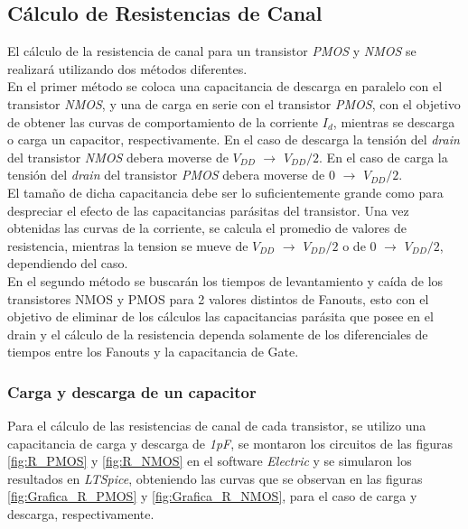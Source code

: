\documentclass[12pt,a4paper]{article} %
\begin{document}
\subsection{Cálculo de Resistencias de Canal}

El cálculo de la resistencia de canal para un transistor \textit{PMOS} y \textit{NMOS} se realizará utilizando dos métodos diferentes.\\

En el primer método se coloca una capacitancia de descarga en paralelo con el transistor \textit{NMOS}, y una de carga en serie con el transistor \textit{PMOS}, con el objetivo de obtener las curvas de comportamiento de la corriente $\textit{I}_{\textit{d}}$, mientras se descarga o carga un capacitor, respectivamente. En el caso de descarga la tensión del \textit{drain} del transistor \textit{NMOS} debera moverse de $\textit{V}_{\textit{DD}}$ $\longrightarrow$ $\textit{V}_{\textit{DD}}/2$. En el caso de carga la tensión del \textit{drain} del transistor \textit{PMOS} debera moverse de $\textit{0}$ $\longrightarrow$ $\textit{V}_{\textit{DD}}/2$.\\

El tamaño de dicha capacitancia debe ser lo suficientemente grande como para despreciar el efecto de las capacitancias parásitas del transistor. Una vez obtenidas las curvas de la corriente, se calcula el promedio de valores de resistencia, mientras la tension se mueve de $\textit{V}_{\textit{DD}}$ $\longrightarrow$ $\textit{V}_{\textit{DD}}/2$ o de $\textit{0}$ $\longrightarrow$ $\textit{V}_{\textit{DD}}/2$, dependiendo del caso.\\

En el segundo método se buscarán los tiempos de levantamiento y caída de los transistores NMOS y PMOS para 2 valores distintos de Fanouts, esto con el objetivo de eliminar de los cálculos las capacitancias parásita que posee en el drain y el cálculo de la resistencia dependa solamente de los diferenciales de tiempos entre los Fanouts y la capacitancia de Gate.

\subsubsection{Carga y descarga de un capacitor}

Para el cálculo de las resistencias de canal de cada transistor, se utilizo una capacitancia de carga y descarga de \textit{1pF}, se montaron los circuitos de las figuras \ref{fig:R_PMOS} y \ref{fig:R_NMOS} en el software \textit{Electric} y se simularon los resultados en  \textit{LTSpice}, obteniendo las curvas que se observan en las figuras \ref{fig:Grafica_R_PMOS} y \ref{fig:Grafica_R_NMOS}, para el caso de carga y descarga, respectivamente.\\
\end{document}
